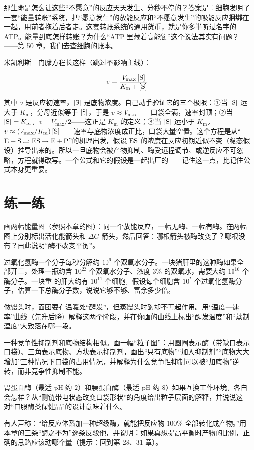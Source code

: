 那生命是怎么让这些“不愿意”的反应天天发生、分秒不停的？答案是：细胞发明了一套“能量转账”系统，把“愿意发生”的放能反应和“不愿意发生”的吸能反应\textbf{捆绑}在一起，用前者拖着后者走。这套转账系统的通用货币，就是你多半听过名字的 ATP。能量到底怎样转账？为什么“ATP 里藏着高能键”这个说法其实有问题？——第 50 章，我们去查细胞的账本。

\begin{tiaozhan}
米凯利斯—门滕方程长这样（跳过不影响主线）：

\[v = \frac{V_{\max}\,[\mathrm{S}]}{K_{\mathrm{m}} + [\mathrm{S}]}\]

其中 $v$ 是反应初速率，$[\mathrm{S}]$ 是底物浓度。自己动手验证它的三个极限：①当 $[\mathrm{S}]$ 远大于 $K_{\mathrm{m}}$，分母近似等于 $[\mathrm{S}]$，于是 $v\approx V_{\max}$——口袋全满，速率封顶；②当 $[\mathrm{S}]=K_{\mathrm{m}}$，$v = V_{\max}/2$——这正是 $K_{\mathrm{m}}$ 的定义；③当 $[\mathrm{S}]$ 远小于 $K_{\mathrm{m}}$，$v\approx (V_{\max}/K_{\mathrm{m}})\,[\mathrm{S}]$——速率与底物浓度成正比，口袋大量空置。这个方程是从“$\mathrm{E}+\mathrm{S}\rightleftharpoons\mathrm{ES}\rightarrow\mathrm{E}+\mathrm{P}$”的机理出发，假设 $\mathrm{ES}$ 的浓度在反应初期近似不变（稳态假设）推导出来的。所以一旦底物会被产物抑制、酶受远程调节、或逆反应不可忽略，方程就得改写。一个公式和它的假设是一起出厂的——记住这一点，比记住公式本身更重要。
\end{tiaozhan}

\section*{练一练}

\begin{sikaoti}
\item 画两幅能量图（参照本章的图）：同一个放能反应，一幅无酶、一幅有酶。在两幅图上分别标出活化能箭头和 $\Delta G$ 箭头，然后回答：哪根箭头被酶改变了？哪根没有？由此说明“酶不改变平衡”。
\item 过氧化氢酶一个分子每秒分解约 $10^{6}$ 个双氧水分子。一块猪肝里的这种酶如果全部开工，处理一瓶约含 $10^{22}$ 个双氧水分子、浓度 $3\%$ 的双氧水，需要大约 $10^{16}$ 个酶分子。一块重  的肝大约有 $10^{11}$ 个细胞，假设每个细胞含 $10^{7}$ 个过氧化氢酶分子，估算一下总酶分子数，说说它够不够、富余多少倍。
\item 做馒头时，面团要在温暖处“醒发”，但蒸馒头时酶却不再起作用。用“温度—速率”曲线（先升后降）解释这两个阶段，并在你画的曲线上标出“醒发温度”和“蒸制温度”大致落在哪一段。
\item 一种竞争性抑制剂和底物结构相似。画一幅“粒子图”：用圆圈表示酶（带缺口表示口袋）、三角表示底物、方块表示抑制剂，画出“只有底物”“加入抑制剂”“底物大大增加”三种情况下口袋的占用情况，并解释为什么竞争性抑制可以被“加底物”逆转，而非竞争性抑制不能。
\item 胃蛋白酶（最适 pH 约 $2$）和胰蛋白酶（最适 pH 约 $8$）如果互换工作环境，各自会怎样？从“侧链带电状态改变口袋形状”的角度给出粒子层面的解释，并说说这对“口服酶类保健品”的设计意味着什么。
\item 有人声称：“给反应体系加一种超级酶，就能把反应物 $100\%$ 全部转化成产物。”用本章的三条“酶之不为”逐条反驳他，并说明：如果真想提高平衡时产物的比例，正确的思路应该动哪个量（提示：回到第 28、31 章）。
\end{sikaoti}
